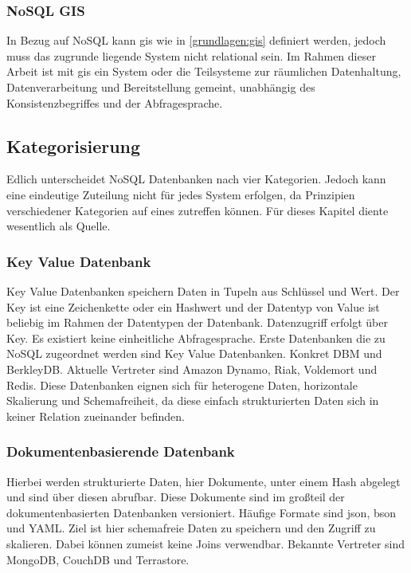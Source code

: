 \subsubsection{NoSQL GIS}

In Bezug auf NoSQL kann \Gls{gis} wie in \ref{grundlagen:gis} definiert werden, jedoch muss das zugrunde liegende System nicht relational sein.
Im Rahmen dieser Arbeit ist mit \Gls{gis} ein System oder die Teilsysteme zur räumlichen Datenhaltung, Datenverarbeitung und Bereitstellung gemeint, unabhängig des Konsistenzbegriffes und der Abfragesprache.

\subsection{Kategorisierung}
Edlich unterscheidet NoSQL Datenbanken nach vier Kategorien.
Jedoch kann eine eindeutige Zuteilung nicht für jedes System erfolgen, da Prinzipien verschiedener Kategorien auf eines zutreffen können.
Für dieses Kapitel diente wesentlich \cite{book:nosql-einfuehrung} als Quelle.


\subsubsection{Key Value Datenbank}

Key Value Datenbanken speichern Daten in Tupeln aus Schlüssel und Wert.
Der Key ist eine Zeichenkette oder ein Hashwert und der Datentyp von Value ist beliebig im Rahmen der Datentypen der Datenbank.
Datenzugriff erfolgt über Key.
Es existiert keine einheitliche Abfragesprache.
Erste Datenbanken die zu NoSQL zugeordnet werden sind Key Value Datenbanken. Konkret DBM und BerkleyDB.
Aktuelle Vertreter sind Amazon Dynamo, Riak, Voldemort und Redis.
Diese Datenbanken eignen sich für heterogene Daten, horizontale Skalierung und Schemafreiheit, da diese einfach strukturierten Daten sich in keiner Relation zueinander befinden.

\subsubsection{Dokumentenbasierende Datenbank}

Hierbei werden strukturierte Daten, hier Dokumente, unter einem Hash abgelegt und sind über diesen abrufbar.
Diese Dokumente sind im großteil der dokumentenbasierten Datenbanken versioniert.
Häufige Formate sind \Gls{json}, \Gls{bson} und YAML.
Ziel ist hier schemafreie Daten zu speichern und den Zugriff zu skalieren.
Dabei können zumeist keine Joins verwendbar.
Bekannte Vertreter sind MongoDB, CouchDB und Terrastore.

